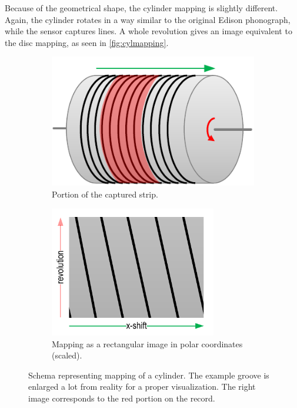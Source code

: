 Because of the geometrical shape, the cylinder mapping is slightly different. Again, the cylinder rotates in a way similar to the original Edison phonograph, while the sensor captures lines. A whole revolution gives an image equivalent to the disc mapping, as seen in \autoref{fig:cylmapping}.

\begin{figure}[!ht]
    \begin{subfigure}[t]{0.45\textwidth}
    \centering
    \includegraphics[width=\textwidth]{images/mapping-cyl-orig}
    \caption{Portion of the captured strip.}
    \label{fig:cylmappingorig}
    \end{subfigure}
    \begin{subfigure}[t]{0.45\textwidth}
    \centering
    \includegraphics[width=0.8\textwidth]{images/mapping-cyl-img}
    \caption{Mapping as a rectangular image in polar coordinates (scaled).}
    \label{fig:cylcmappingimage}
    \end{subfigure}
    \caption[Schema representing mapping of a cylinder.]
    {Schema representing mapping of a cylinder. The example groove is enlarged a lot from reality for a proper visualization. The right image corresponds to the red portion on the record.}
    \label{fig:cylmapping}
\end{figure}

